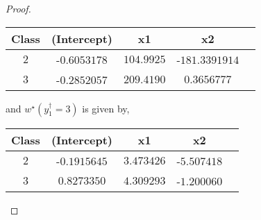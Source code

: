 \documentclass{article}
\begin{document}
\begin{proof}
\begin{center} \begin{tabular}{|c|c|c|c|c|}
\hline
 Class &(Intercept) &x1 &x2\\ \hline
$2$ &-$0.6053178$ &$104.9925$ &-$181.3391914$\\ \hline
$3$ &-$0.2852057$ &$209.4190$ &$0.3656777$\\ \hline
\end{tabular} \end{center}
and $w^\star \left(y^{\dagger}_{1} = 3\right)$ is given by,

\begin{center} \begin{tabular}{|c|c|c|c|c|}
\hline
 Class &(Intercept) &x1 &x2\\ \hline
$2$ &-$0.1915645$ &$3.473426$ &-$5.507418$\\ \hline
$3$ &$0.8273350$ &$4.309293$ &-$1.200060$\\ \hline
\end{tabular} \end{center}
\end{proof}
\end{document}
